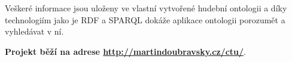 \vspace*{12pt}

Veškeré informace jsou uloženy ve vlastní vytvořené hudební ontologii a díky technologiím jako je RDF a SPARQL dokáže aplikace ontologii porozumět a vyhledávat v ní.
 
\vspace*{12pt}

\textbf{Projekt běží na adrese \url{http://martindoubravsky.cz/ctu/}}.